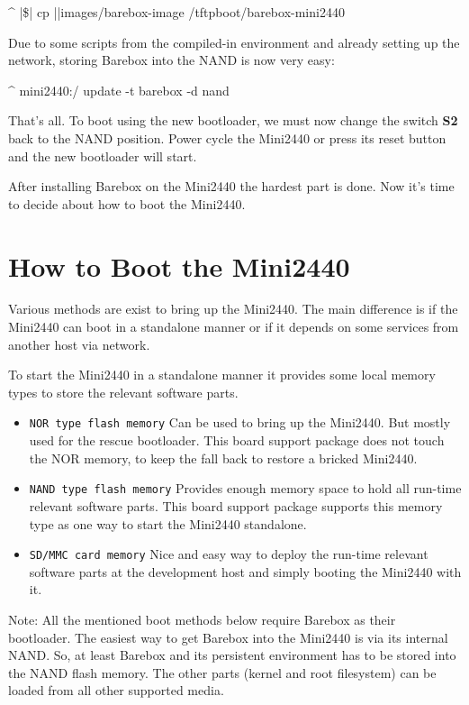 \begin{ptxshell}[escapechar=|]{^}
|\$| cp |\ptxdistPlatformDir |images/barebox-image /tftpboot/barebox-mini2440
\end{ptxshell}

Due to some scripts from the compiled-in environment and already setting up the
network, storing Barebox into the NAND is now very easy:

\begin{ptxshell}[escapechar=|]{^}
mini2440:/ update -t barebox -d nand
\end{ptxshell}

That's all. To boot using the new bootloader, we must now change the switch
\textbf{S2} back to the NAND position. Power cycle the Mini2440 or press its
reset button and the new bootloader will start.

After installing Barebox on the Mini2440 the hardest part is done. Now it's
time to decide about how to boot the Mini2440.

\section{How to Boot the Mini2440}	\label{sec:bootingmini2440}

Various methods are exist to bring up the Mini2440. The main difference is if
the Mini2440 can boot in a standalone manner or if it depends on some services
from another host via network.

To start the Mini2440 in a standalone manner it provides some local memory types
to store the relevant software parts.

\begin{itemize}
\item \texttt{NOR type flash memory} Can be used to bring up the Mini2440. But
	mostly used for the rescue bootloader. This board support package does
	not touch the NOR memory, to keep the fall back to restore a bricked
	Mini2440.
\item \texttt{NAND type flash memory} Provides enough memory space to hold all
	run-time relevant software parts. This board support package supports
	this memory type as one way to start the Mini2440 standalone.
\item \texttt{SD/MMC card memory} Nice and easy way to deploy the run-time
	relevant software parts at the development host and simply booting
	the Mini2440 with it.
\end{itemize}

Note: All the mentioned boot methods below require Barebox as their bootloader.
The easiest way to get Barebox into the Mini2440 is via its internal NAND. So,
at least Barebox and its persistent environment has to be stored into the NAND
flash memory. The other parts (kernel and root filesystem) can be loaded from
all other supported media.

